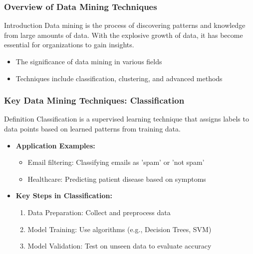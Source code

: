 \documentclass[aspectratio=169]{beamer}
\begin{document}
\begin{frame}[fragile]
    \frametitle{Overview of Data Mining Techniques}
    \begin{block}{Introduction}
        Data mining is the process of discovering patterns and knowledge from large amounts of data. With the explosive growth of data, it has become essential for organizations to gain insights.
    \end{block}
    
    \begin{itemize}
        \item The significance of data mining in various fields
        \item Techniques include classification, clustering, and advanced methods
    \end{itemize}
\end{frame}

\begin{frame}[fragile]
    \frametitle{Key Data Mining Techniques: Classification}
    \begin{block}{Definition}
        Classification is a supervised learning technique that assigns labels to data points based on learned patterns from training data.
    \end{block}

    \begin{itemize}
        \item \textbf{Application Examples:}
            \begin{itemize}
                \item Email filtering: Classifying emails as 'spam' or 'not spam'
                \item Healthcare: Predicting patient disease based on symptoms
            \end{itemize}
        
        \item \textbf{Key Steps in Classification:}
            \begin{enumerate}
                \item Data Preparation: Collect and preprocess data
                \item Model Training: Use algorithms (e.g., Decision Trees, SVM)
                \item Model Validation: Test on unseen data to evaluate accuracy
            \end{enumerate}
    \end{itemize}
\end{frame}
\end{document}
